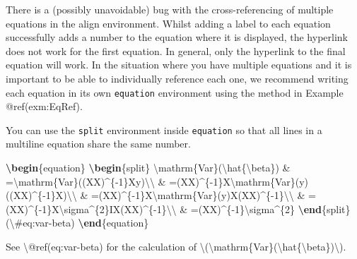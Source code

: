 \documentclass[
  letterpaper,
]{article}
\newenvironment{Shaded}{\begin{snugshade}}{\end{snugshade}}
\newcommand{\ExtensionTok}[1]{\textcolor[rgb]{0.00,0.23,0.31}{#1}}
\newcommand{\FunctionTok}[1]{\textcolor[rgb]{0.28,0.35,0.67}{#1}}
\newcommand{\KeywordTok}[1]{\textcolor[rgb]{0.00,0.23,0.31}{\textbf{#1}}}
\newcommand{\NormalTok}[1]{\textcolor[rgb]{0.00,0.23,0.31}{#1}}
\newcommand{\SpecialCharTok}[1]{\textcolor[rgb]{0.37,0.37,0.37}{#1}}
\newcommand{\SpecialStringTok}[1]{\textcolor[rgb]{0.13,0.47,0.30}{#1}}
\numberwithin{equation}{section}
\numberwithin{figure}{section}
\theoremstyle{break}
\begin{document}
There is a (possibly unavoidable) bug with the cross-referencing of
multiple equations in the align environment. Whilst adding a label to
each equation successfully adds a number to the equation where it is
displayed, the hyperlink does not work for the first equation. In
general, only the hyperlink to the final equation will work. In the
situation where you have multiple equations and it is important to be
able to individually reference each one, we recommend writing each
equation in its own \texttt{equation} environment using the method in
Example @ref(exm:EqRef).

You can use the \texttt{split} environment inside \texttt{equation} so
that all lines in a multiline equation share the same number.

\begin{Shaded}
\begin{Highlighting}[]
\KeywordTok{\textbackslash{}begin}\NormalTok{\{}\ExtensionTok{equation}\NormalTok{\}}\SpecialStringTok{ }
\KeywordTok{\textbackslash{}begin}\NormalTok{\{}\ExtensionTok{split}\NormalTok{\}}
\SpecialCharTok{\textbackslash{}mathrm}\SpecialStringTok{\{Var\}(}\SpecialCharTok{\textbackslash{}hat}\SpecialStringTok{\{}\SpecialCharTok{\textbackslash{}beta}\SpecialStringTok{\}) \& =}\SpecialCharTok{\textbackslash{}mathrm}\SpecialStringTok{\{Var\}((X\textquotesingle{}X)\^{}\{{-}1\}X\textquotesingle{}y)}\SpecialCharTok{\textbackslash{}\textbackslash{}}
\SpecialStringTok{ \& =(X\textquotesingle{}X)\^{}\{{-}1\}X\textquotesingle{}}\SpecialCharTok{\textbackslash{}mathrm}\SpecialStringTok{\{Var\}(y)((X\textquotesingle{}X)\^{}\{{-}1\}X\textquotesingle{})\textquotesingle{}}\SpecialCharTok{\textbackslash{}\textbackslash{}}
\SpecialStringTok{ \& =(X\textquotesingle{}X)\^{}\{{-}1\}X\textquotesingle{}}\SpecialCharTok{\textbackslash{}mathrm}\SpecialStringTok{\{Var\}(y)X(X\textquotesingle{}X)\^{}\{{-}1\}}\SpecialCharTok{\textbackslash{}\textbackslash{}}
\SpecialStringTok{ \& =(X\textquotesingle{}X)\^{}\{{-}1\}X\textquotesingle{}}\SpecialCharTok{\textbackslash{}sigma}\SpecialStringTok{\^{}\{2\}IX(X\textquotesingle{}X)\^{}\{{-}1\}}\SpecialCharTok{\textbackslash{}\textbackslash{}}
\SpecialStringTok{ \& =(X\textquotesingle{}X)\^{}\{{-}1\}}\SpecialCharTok{\textbackslash{}sigma}\SpecialStringTok{\^{}\{2\}}
\KeywordTok{\textbackslash{}end}\NormalTok{\{}\ExtensionTok{split}\NormalTok{\}}
\SpecialStringTok{(}\SpecialCharTok{\textbackslash{}\#}\SpecialStringTok{eq:var{-}beta)}
\KeywordTok{\textbackslash{}end}\NormalTok{\{}\ExtensionTok{equation}\NormalTok{\} }

\NormalTok{See }\FunctionTok{\textbackslash{}@ref}\NormalTok{(eq:var{-}beta) for the calculation of }\SpecialStringTok{\textbackslash{}(}\SpecialCharTok{\textbackslash{}mathrm}\SpecialStringTok{\{Var\}(}\SpecialCharTok{\textbackslash{}hat}\SpecialStringTok{\{}\SpecialCharTok{\textbackslash{}beta}\SpecialStringTok{\})\textbackslash{})}\NormalTok{.}
\end{Highlighting}
\end{Shaded}
\end{document}
